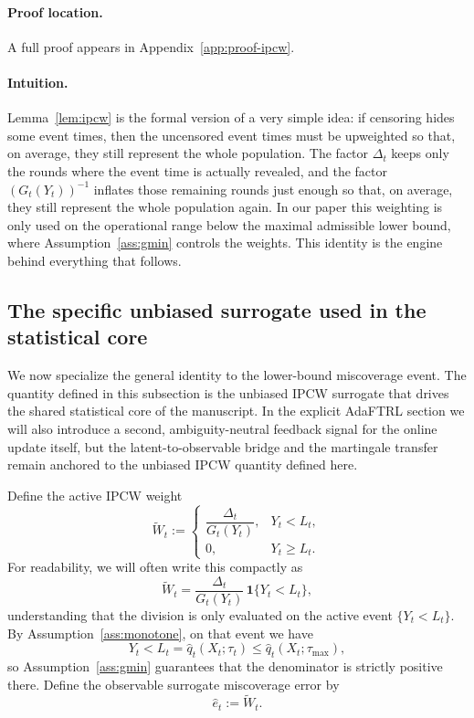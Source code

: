\documentclass[11pt]{article}
\newcommand{\1}{\mathbf{1}}
\begin{document}
\paragraph{Proof location.} A full proof appears in Appendix~\ref{app:proof-ipcw}.


\paragraph{Intuition.} Lemma~\ref{lem:ipcw} is the formal version of a very simple idea: if censoring hides some event times, then the uncensored event times must be upweighted so that, on average, they still represent the whole population. The factor $\Delta_t$ keeps only the rounds where the event time is actually revealed, and the factor $(G_t(Y_t))^{-1}$ inflates those remaining rounds just enough so that, on average, they still represent the whole population again. In our paper this weighting is only used on the operational range below the maximal admissible lower bound, where Assumption~\ref{ass:gmin} controls the weights. This identity is the engine behind everything that follows.


\subsection{The specific unbiased surrogate used in the statistical core}

We now specialize the general identity to the lower-bound miscoverage event. The quantity defined in this subsection is the unbiased IPCW surrogate that drives the shared statistical core of the manuscript. In the explicit AdaFTRL section we will also introduce a second, ambiguity-neutral feedback signal for the online update itself, but the latent-to-observable bridge and the martingale transfer remain anchored to the unbiased IPCW quantity defined here.

Define the active IPCW weight
\[
\widetilde W_t:=
\begin{cases}
\dfrac{\Delta_t}{G_t(Y_t)}, & Y_t<L_t,\\[1ex]
0, & Y_t\ge L_t.
\end{cases}
\]
For readability, we will often write this compactly as
\[
\widetilde W_t=\frac{\Delta_t}{G_t(Y_t)}\,\1\{Y_t<L_t\},
\]
understanding that the division is only evaluated on the active event $\{Y_t<L_t\}$. By Assumption~\ref{ass:monotone}, on that event we have
\[
Y_t<L_t=\hat q_t(X_t;\tau_t)\le \hat q_t(X_t;\tau_{\max}),
\]
so Assumption~\ref{ass:gmin} guarantees that the denominator is strictly positive there.
Define the observable surrogate miscoverage error by
\[
\hat e_t:=\widetilde W_t.
\]
\end{document}
